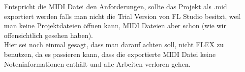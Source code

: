 \bigskip

Entspricht die MIDI Datei den Anforderungen, sollte das Projekt als .mid exportiert werden falls man nicht die Trial Version von FL Studio besitzt, weil man keine Projektdateien öffnen kann, MIDI Dateien aber schon (wie wir offensichtlich gesehen haben). \\
Hier sei noch einmal gesagt, dass man darauf achten soll, nicht FLEX zu benutzen, da es passieren kann, dass die exportierte MIDI Datei keine Noteninformationen enthält und alle Arbeiten verloren gehen.